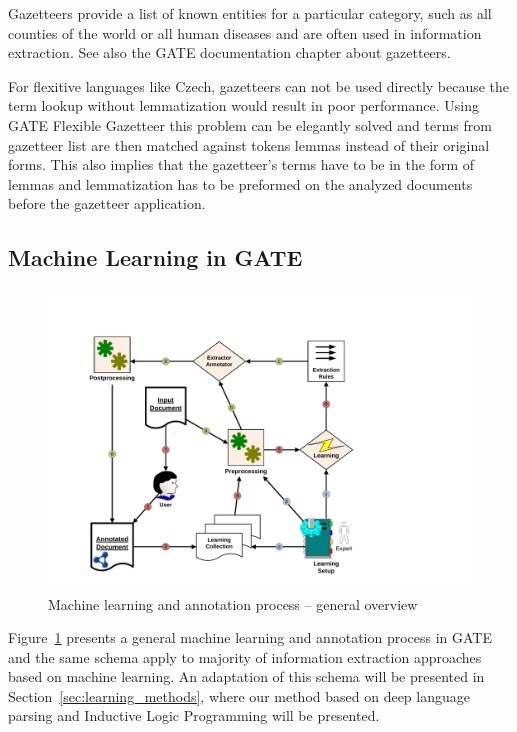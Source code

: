 Gazetteers provide a list of known entities for a particular category, such as all counties of the world or all human diseases and are often used in information extraction. See also the GATE documentation chapter about gazetteers.

For flexitive languages like Czech, gazetteers can not be used directly because the term lookup without lemmatization would result in poor performance. Using GATE Flexible Gazetteer this problem can be elegantly solved and terms from gazetteer list are then matched against tokens lemmas instead of their original forms. This also implies that the gazetteer’s terms have to be in the form of lemmas and lemmatization has to be preformed on the analyzed documents before the gazetteer application.



\subsection{Machine Learning in GATE} \label{sec:third_gate_ML}

\begin{figure}[b!]
\centering
\includegraphics[angle=-90, width=0.8\hsize]{../img/ch10/annotation_process}
\caption{Machine learning and annotation process -- general overview}
\label{fig:ExtractionProcessIntro}
\end{figure}


Figure~\ref{fig:ExtractionProcessIntro} presents a general machine learning and annotation process in GATE and the same schema apply to majority of information extraction approaches based on machine learning. An adaptation of this schema will be presented in Section~\ref{sec:learning_methods}, where our method based on deep language parsing and Inductive Logic Programming will be presented.

